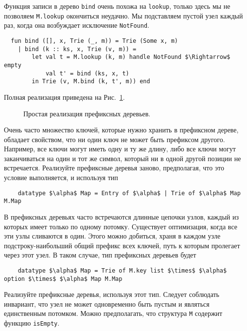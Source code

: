 Функция записи в дерево \lstinline!bind! очень похожа на
\lstinline!lookup!, только здесь мы не позволяем \lstinline!M.lookup!
окончиться неудачно. Мы подставляем пустой узел каждый раз, когда она
возбуждает исключение \lstinline!NotFound!.
\begin{lstlisting}
  fun bind ([], x, Trie (_, m)) = Trie (Some x, m)
    | bind (k :: ks, x, Trie (v, m)) =
        let val t = M.lookup (k, m) handle NotFound $\Rightarrow$ empty
            val t' = bind (ks, x, t)
        in Trie (v, M.bind (k, t', m)) end
\end{lstlisting}
Полная реализация приведена на Рис.~\ref{fig:10.10}.

\begin{figure}
  \centering

  \caption{Простая реализация префиксных деревьев.}
  \label{fig:10.10}
\end{figure}

\begin{exercise}\label{ex:10.9}
  Очень часто множество ключей, которые нужно хранить в префиксном
  дереве, обладает свойством, что ни один ключ не может быть префиксом
  другого. Например, все ключи могут иметь одну и ту же длину, либо
  все ключи могут заканчиваться на один и тот же символ, который ни в
  одной другой позиции не встречается. Реализуйте префиксные деревья
  заново, предполагая, что это условие выполняется, и используя тип
  \begin{lstlisting}
    datatype $\alpha$ Map = Entry of $\alpha$ | Trie of $\alpha$ Map M.Map
  \end{lstlisting}
\end{exercise}

\begin{exercise}\label{ex:10.10}
  В префиксных деревьях часто встречаются длинные цепочки узлов,
  каждый из которых имеет только по одному потомку. Существует
  оптимизация, когда все эти узлы сливаются в один. Этого можно
  добиться, храня в каждом узле подстроку-наибольший общий префикс
  всех ключей, путь к которым пролегает через этот узел. В таком
  случае, тип префиксных деревьев будет
  \begin{lstlisting}
    datatype $\alpha$ Map = Trie of M.key list $\times$ $\alpha$ option $\times$ $\alpha$ Map M.Map
  \end{lstlisting}
  Реализуйте префиксные деревья, используя этот тип. Следует соблюдать
  инвариант, что узел не может одновременно быть пустым и являться
  единственным потомком. Можно предполагать, что структура
  \lstinline!M! содержит функцию \lstinline!isEmpty!.
\end{exercise}

